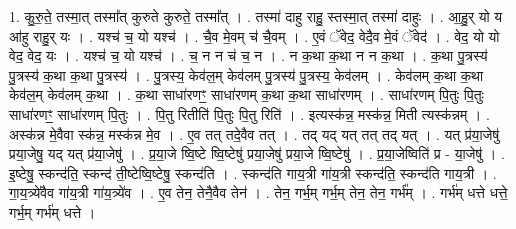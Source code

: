 \documentclass[17pt]{extarticle}
\begin{document}
1. कु॒रु॒ते॒ तस्मा॒त् तस्मा᳚त् कुरुते कुरुते॒ तस्मा᳚त् । . तस्मा॑ दाहु राहु॒ स्तस्मा॒त् तस्मा॑ दाहुः । . आ॒हु॒र् यो य आ॑हु राहु॒र् यः । . यश्च॑ च॒ यो यश्च॑ । . चै॒व मे॒वम् च॑ चै॒वम् । . ए॒वं ॅवेद॒ वेदै॒व मे॒वं ॅवेद॑ । . वेद॒ यो यो वेद॒ वेद॒ यः । . यश्च॑ च॒ यो यश्च॑ । . च॒ न न च॑ च॒ न । . न क॒था क॒था न न क॒था । . क॒था पु॒त्रस्य॑ पु॒त्रस्य॑ क॒था क॒था पु॒त्रस्य॑ । . पु॒त्रस्य॒ केव॑ल॒म् केव॑लम् पु॒त्रस्य॑ पु॒त्रस्य॒ केव॑लम् । . केव॑लम् क॒था क॒था केव॑ल॒म् केव॑लम् क॒था । . क॒था साधा॑रणꣳ॒॒ साधा॑रणम् क॒था क॒था साधा॑रणम् । . साधा॑रणम् पि॒तुः पि॒तुः साधा॑रणꣳ॒॒ साधा॑रणम् पि॒तुः । . पि॒तु रितीति॑ पि॒तुः पि॒तु रिति॑ । . इत्यस्क॑न्न॒ मस्क॑न्न॒ मिती त्यस्क॑न्नम् । . अस्क॑न्न मे॒वैवा स्क॑न्न॒ मस्क॑न्न मे॒व । . ए॒व तत् तदे॒वैव तत् । . तद् यद् यत् तत् तद् यत् । . यत् प्र॑या॒जेषु॑ प्रया॒जेषु॒ यद् यत् प्र॑या॒जेषु॑ । . प्र॒या॒जे ष्वि॒ष्टे ष्वि॒ष्टेषु॑ प्रया॒जेषु॑ प्रया॒जे ष्वि॒ष्टेषु॑ । . प्र॒या॒जेष्विति॑ प्र - या॒जेषु॑ । . इ॒ष्टेषु॒ स्कन्द॑ति॒ स्कन्द॑ ती॒ष्टेष्वि॒ष्टेषु॒ स्कन्द॑ति । . स्कन्द॑ति गाय॒त्री गा॑य॒त्री स्कन्द॑ति॒ स्कन्द॑ति गाय॒त्री । . गा॒य॒त्र्ये॑वैव गा॑य॒त्री गा॑य॒त्र्ये॑व । . ए॒व तेन॒ तेनै॒वैव तेन॑ । . तेन॒ गर्भ॒म् गर्भ॒म् तेन॒ तेन॒ गर्भ᳚म् । . गर्भ॑म् धत्ते धत्ते॒ गर्भ॒म् गर्भ॑म् धत्ते । \newline
\end{document}
